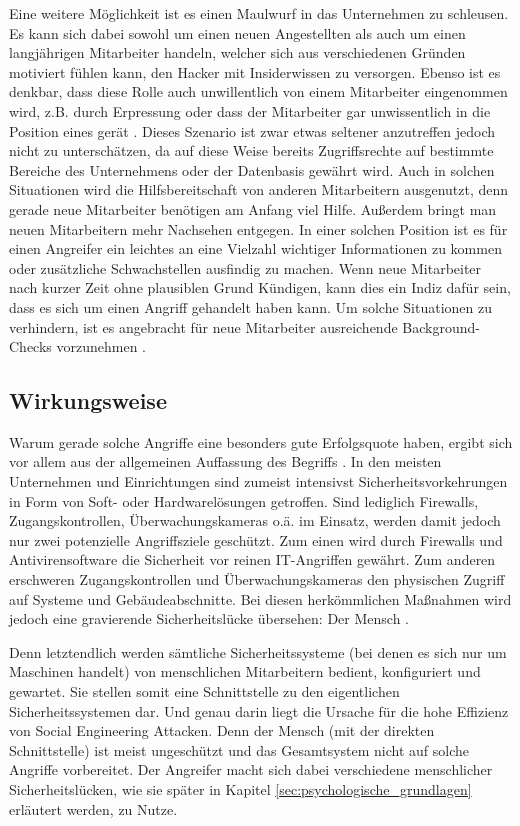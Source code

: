 Eine weitere Möglichkeit ist es einen Maulwurf in das Unternehmen zu schleusen.
Es kann sich dabei sowohl um einen neuen Angestellten als auch um einen langjährigen Mitarbeiter handeln, welcher sich aus verschiedenen Gründen motiviert fühlen kann, den Hacker mit Insiderwissen zu versorgen.
Ebenso ist es denkbar, dass diese Rolle auch unwillentlich von einem Mitarbeiter eingenommen wird, z.B. durch Erpressung oder dass der Mitarbeiter gar unwissentlich in die Position eines  gerät \citep{Dhanjani2009}.
Dieses Szenario ist zwar etwas seltener anzutreffen jedoch nicht zu unterschätzen, da auf diese
Weise bereits Zugriffsrechte auf bestimmte Bereiche des Unternehmens oder der Datenbasis gewährt wird.
Auch in solchen Situationen wird die Hilfsbereitschaft von anderen Mitarbeitern ausgenutzt, denn
gerade neue Mitarbeiter benötigen am Anfang viel Hilfe.
Außerdem bringt man neuen Mitarbeitern mehr Nachsehen entgegen.
In einer solchen Position ist es für einen Angreifer ein leichtes an eine Vielzahl wichtiger
Informationen zu kommen oder zusätzliche Schwachstellen ausfindig zu machen.
Wenn neue Mitarbeiter nach kurzer Zeit ohne plausiblen Grund Kündigen, kann dies ein Indiz dafür sein,
dass es sich um einen Angriff gehandelt haben kann.
Um solche Situationen zu verhindern, ist es angebracht für neue Mitarbeiter ausreichende Background-Checks vorzunehmen \citep{hacking-the-human}.

\subsection{Wirkungsweise}\label{sec:wirkungsweise}

Warum gerade solche Angriffe eine besonders gute Erfolgsquote haben, ergibt sich vor allem aus der allgemeinen Auffassung des Begriffs .
In den meisten Unternehmen und Einrichtungen sind zumeist intensivst Sicherheitsvorkehrungen in Form von Soft- oder Hardwarelösungen getroffen.
Sind lediglich Firewalls, Zugangskontrollen, Überwachungskameras o.ä. im Einsatz, werden damit jedoch nur zwei potenzielle Angriffsziele geschützt.
Zum einen wird durch Firewalls und Antivirensoftware die Sicherheit vor reinen IT-Angriffen gewährt.
Zum anderen erschweren Zugangskontrollen und Überwachungskameras den physischen Zugriff auf Systeme und Gebäudeabschnitte.
Bei diesen herkömmlichen Maßnahmen wird jedoch eine gravierende Sicherheitslücke übersehen: Der Mensch \citep{hacking-the-human}.

Denn letztendlich werden sämtliche Sicherheitssysteme (bei denen es sich nur um Maschinen handelt) von menschlichen Mitarbeitern bedient, konfiguriert und gewartet.
Sie stellen somit eine Schnittstelle zu den eigentlichen Sicherheitssystemen dar.
Und genau darin liegt die Ursache für die hohe Effizienz von Social Engineering Attacken.
Denn der Mensch (mit der direkten Schnittstelle) ist meist ungeschützt und das Gesamtsystem nicht auf solche Angriffe vorbereitet.
Der Angreifer macht sich dabei verschiedene menschlicher Sicherheitslücken, wie sie später in Kapitel \vref{sec:psychologische_grundlagen} erläutert werden, zu Nutze.

